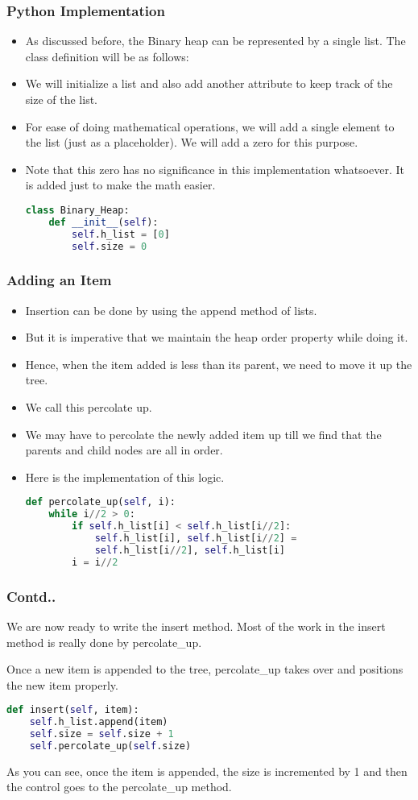 \documentclass{beamer}
\begin{document}
\begin{frame}[fragile]
\frametitle{Python Implementation}
\begin{itemize}
\item As discussed before, the Binary heap can be represented by a single list. The class definition will be as follows:
\item We will initialize a list and also add another attribute to keep track of the size of the list. 
\item For ease of doing mathematical operations, we will add a single element to the list (just as a placeholder). We will add a zero for this purpose.
\item Note that this zero has no significance in this implementation whatsoever. It is added just to make the math easier.
\begin{lstlisting}[language=Python]
class Binary_Heap:
    def __init__(self):
        self.h_list = [0]
        self.size = 0
\end{lstlisting}
\end{itemize}
\end{frame}

\begin{frame}[fragile]
\frametitle{Adding an Item}
\begin{itemize}
\item Insertion can be done by using the append method of lists.
\item But it is imperative that we maintain the heap order property while doing it.
\item Hence, when the item added is less than its parent, we need to move it up the tree.
\item We call this percolate up.
\item We may have to percolate the newly added item up till we find that the parents and child nodes are all in order.
\item Here is the implementation of this logic.
\begin{lstlisting}[language=Python]
def percolate_up(self, i):
    while i//2 > 0:
        if self.h_list[i] < self.h_list[i//2]:
            self.h_list[i], self.h_list[i//2] = 
            self.h_list[i//2], self.h_list[i]
        i = i//2
\end{lstlisting}
\end{itemize}
\end{frame}

\begin{frame}[fragile]
\frametitle{Contd..}
We are now ready to write the insert method. Most of the work in the insert method is really done by percolate\_up. 

Once a new item is appended to the tree, percolate\_up takes over and positions the new item properly.

\begin{lstlisting}[language=Python]
def insert(self, item):
    self.h_list.append(item)
    self.size = self.size + 1
    self.percolate_up(self.size)
\end{lstlisting}
As you can see, once the item is appended, the size is incremented by 1 and then the control goes to the percolate\_up method.
\end{frame}
\end{document}
